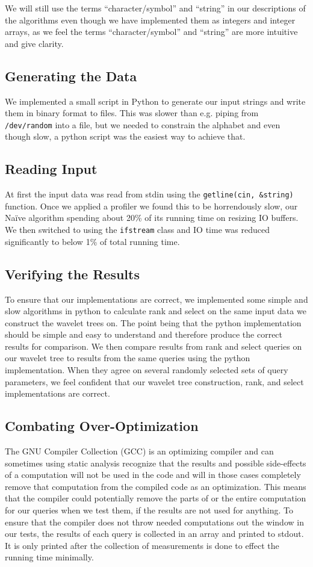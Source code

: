 We will still use the terms “character/symbol” and “string” in our descriptions of the algorithms even though we have implemented them as integers and integer arrays, as we feel the terms “character/symbol” and “string” are more intuitive and give clarity.


\subsection{Generating the Data}
We implemented a small script in Python to generate our input strings and write them in binary format to files.
This was slower than e.g. piping from \texttt{/dev/random} into a file, but we needed to constrain the alphabet and even though slow, a python script was the easiest way to achieve that.

\subsection{Reading Input}
At first the input data was read from stdin using the \texttt{getline(cin, \&string)} function. 
Once we applied a profiler we found this to be horrendously slow, our Naïve algorithm spending about 20\% of its running time on resizing IO buffers. 
We then switched to using the \texttt{ifstream} class and IO time was reduced significantly to below 1\% of total running time.

\subsection{Verifying the Results}
To ensure that our implementations are correct, we implemented some simple and slow algorithms in python to calculate rank and select on the same input data we construct the wavelet trees on.
The point being that the python implementation should be simple and easy to understand and therefore produce the correct results for comparison.
We then compare results from rank and select queries on our wavelet tree to results from the same queries using the python implementation.
When they agree on several randomly selected sets of query parameters, we feel confident that our wavelet tree construction, rank, and select implementations are correct.

\subsection{Combating Over-Optimization}
The GNU Compiler Collection (GCC) is an optimizing compiler and can sometimes using static analysis recognize that the results and possible side-effects of a computation will not be used in the code and will in those cases completely remove that computation from the compiled code as an optimization.
This means that the compiler could potentially remove the parts of or the entire computation for our queries when we test them, if the results are not used for anything.
To ensure that the compiler does not throw needed computations out the window in our tests, the results of each query is collected in an array and printed to stdout. It is only printed after the collection of measurements is done to effect the running time minimally.

